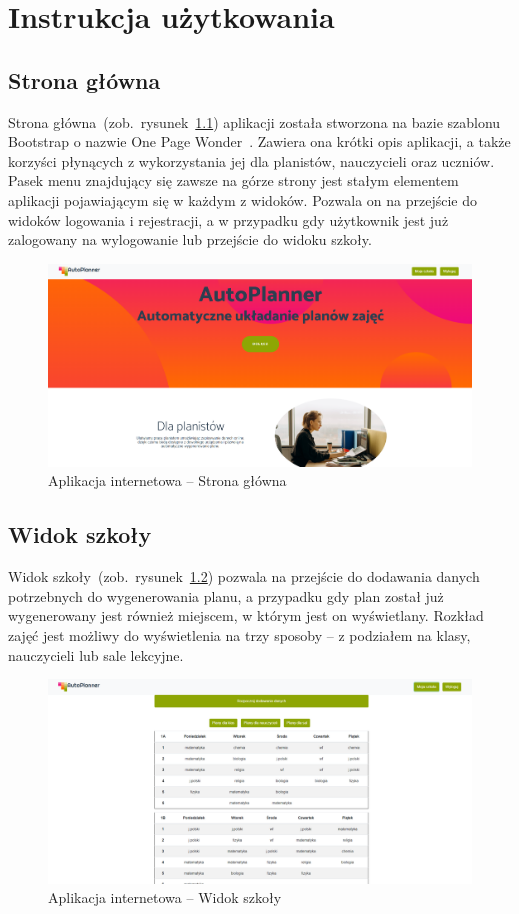 \chapter{Instrukcja użytkowania}
\section{Strona główna}
Strona główna~(zob.~rysunek~\ref{rys:main}) aplikacji została stworzona na bazie szablonu Bootstrap o nazwie One Page Wonder~\cite{opw}. Zawiera ona krótki opis aplikacji, a także korzyści płynących z wykorzystania jej dla planistów, nauczycieli oraz uczniów. Pasek menu znajdujący się zawsze na górze strony jest stałym elementem aplikacji pojawiającym się w każdym z widoków. Pozwala on na przejście do widoków logowania i rejestracji, a w przypadku gdy użytkownik jest już zalogowany na wylogowanie lub przejście do widoku szkoły. 
\begin{figure}[!ht]
\centering\includegraphics[width=\textwidth]{figures/main}
\caption{Aplikacja internetowa -- Strona główna}\label{rys:main}
\end{figure}
\section{Widok szkoły}
Widok szkoły~(zob.~rysunek~\ref{rys:school}) pozwala na przejście do dodawania danych potrzebnych do wygenerowania planu, a przypadku gdy plan został już wygenerowany jest również miejscem, w którym jest on wyświetlany. Rozkład zajęć jest możliwy do wyświetlenia na trzy sposoby -- z podziałem na klasy, nauczycieli lub sale lekcyjne.

\begin{figure}[!ht]
\centering\includegraphics[width=\textwidth]{figures/school}
\caption{Aplikacja internetowa -- Widok szkoły}\label{rys:school}
\end{figure}
